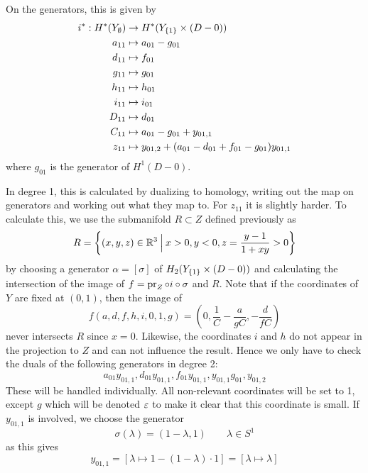 On the generators, this is given by
\begin{align*}
  i^* : H^*(Y_{\emptyset}) &\to H^*(Y_{\left\{ 1 \right\}}\times (D-0)) \\
  a_{11} & \mapsto a_{01} - g_{01} \\
  d_{11} &\mapsto f_{01} \\
  g_{11} &\mapsto g_{01} \\
  h_{11} &\mapsto h_{01} \\
  i_{11} &\mapsto i_{01} \\
  D_{11} &\mapsto d_{01} \\
  C_{11} &\mapsto a_{01} - g_{01} + y_{01,1} \\
  z_{11} &\mapsto y_{01,2} + (a_{01}-d_{01}+f_{01}-g_{01})y_{01,1}
\end{align*}
where $g_{01}$ is the generator of $H^1(D-0)$.

In degree 1, this is calculated by dualizing to homology, writing out
the map on generators and working
out what they map to. For $z_{11}$ it is slightly
harder. To calculate this, we use the submanifold $R \subset Z$
defined previously as
\[ R = \left\{ (x,y,z)\in \mathbb{R}^3 \: \Big\vert\: x > 0, y < 0, z =
  \frac{y-1}{1+xy}>0 \right\} \]
by choosing a generator $\alpha = [\sigma]$ of $H_2(Y_{\left\{ 1 \right\}}\times
(D-0))$ and calculating the intersection of the image of $f = \operatorname{pr}_Z
\circ i\circ \sigma$ and $R$. Note that if the coordinates of $Y$ are
fixed at $(0,1)$, then the image of
\[ f(a,d,f,h,i,0,1,g) =
\left(0,\frac{1}{C}-\frac{a}{gC},-\frac{d}{fC} \right)\]
never intersects $R$ since $x = 0$. Likewise, the coordinates $i$ and
$h$ do not appear in the projection to $Z$ and can not influence the
result. Hence we only have to check the duals of the following
generators in degree 2:
\[ a_{01} y_{01,1}, d_{01} y_{01,1}, f_{01} y_{01,1}, y_{01,1} g_{01},
y_{01,2} \]
These will be handled individually. All non-relevant coordinates will
be set to 1, except $g$ which will be denoted $\varepsilon$ to make it clear
that this coordinate is small. If $y_{01,1}$ is involved, we choose the
generator
\[ \sigma(\lambda) = (1-\lambda,1) \qquad \lambda\in S^1 \]
as this gives
\[ y_{01,1} = [\lambda \mapsto 1-(1-\lambda)\cdot 1] = [\lambda
\mapsto \lambda] \]

